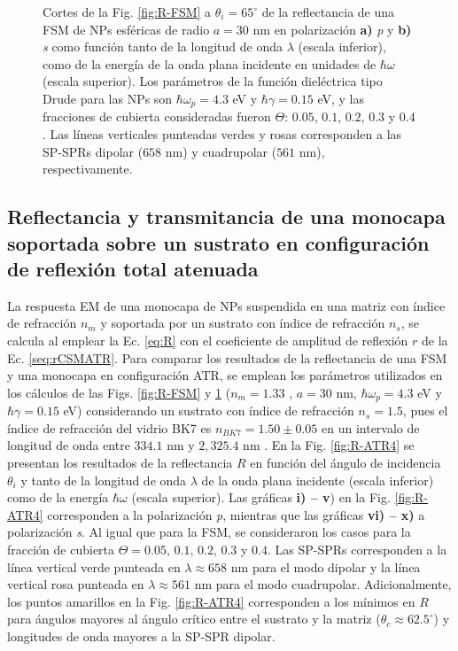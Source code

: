 \begin{figure}[h!]
	\caption{Cortes de la Fig. \ref{fig:R-FSM} a $\theta_i = 65^\circ$ de la reflectancia de una FSM de NPs esféricas de radio $a=30$ nm en polarización \textbf{a)} \emph{p} y \textbf{b)} \emph{s} como función tanto de la longitud de onda $\lambda$ (escala inferior), como de la energía de la onda plana incidente en unidades de $\hbar\omega$ (escala superior). Los parámetros de la función dieléctrica tipo Drude para las NPs son $\hbar\omega_p = 4.3$ eV y $\hbar\gamma = 0.15$ eV, y las fracciones de cubierta consideradas fueron $\Theta$: $0. 05$, $0. 1$, $0. 2$, $0. 3$ y $0. 4$. Las líneas verticales punteadas verdes y rosas corresponden a las SP-SPRs dipolar ($658$ nm) y cuadrupolar ($561$ nm), respectivamente.}\label{fig:FSM-Cuts}
	\end{figure}	


	\subsection{Reflectancia y transmitancia de una monocapa soportada sobre un sustrato en configuración de reflexión total atenuada}
	\label{ssection:DrudeATR}

La respuesta EM de una monocapa de NPs suspendida en una matriz con índice de refracción $n_m$ y soportada por un sustrato con índice de refracción $n_s$, se calcula al emplear la Ec.  \eqref{eq:R} con el coeficiente de amplitud de reflexión $r$ de la Ec.  \eqref{seq:rCSMATR}. Para comparar los resultados de la reflectancia de una FSM y una monocapa en configuración ATR, se emplean los parámetros utilizados en los cálculos de las Figs. \ref{fig:R-FSM} y \ref{fig:FSM-Cuts} ($n_m=1.33$ , $a=30$ nm, $\hbar\omega_p=4.3$ eV y  $\hbar\gamma = 0.15$ eV) considerando un sustrato con índice de refracción $n_s=1.5$, pues el índice de refracción del vidrio BK7 es $n_{BK7}=1.50\pm 0.05$ en un intervalo de longitud de onda entre $334.1$ nm y $2,325.4$ nm \cite{schott2019datasheet}. En la Fig.  \ref{fig:R-ATR4} se presentan los resultados de la reflectancia $R$ en función del ángulo de incidencia $\theta_i$ y tanto de la longitud de onda $\lambda$ de la onda plana incidente (escala inferior) como de la energía $\hbar\omega$ (escala superior). Las gráficas \textbf{i) -- v}) en la Fig. \ref{fig:R-ATR4}  corresponden a la polarización \emph{p}, mientras que las gráficas \textbf{vi) -- x)} a polarización \emph{s}. Al igual que para la FSM, se consideraron los casos para la fracción de cubierta $\Theta = 0.05,\,0.1,\,0.2,\,0.3$ y $0.4$. Las SP-SPRs corresponden a la línea vertical verde punteada en $\lambda \approx 658$ nm para el modo dipolar y la línea vertical rosa punteada en  $\lambda \approx 561$ nm para el modo cuadrupolar. Adicionalmente, los puntos amarillos en la Fig. \ref{fig:R-ATR4} corresponden a los mínimos en $R$ para ángulos mayores al ángulo crítico entre el sustrato y la matriz ($\theta_c\approx 62.5^\circ$) y longitudes de onda mayores a la SP-SPR dipolar.


